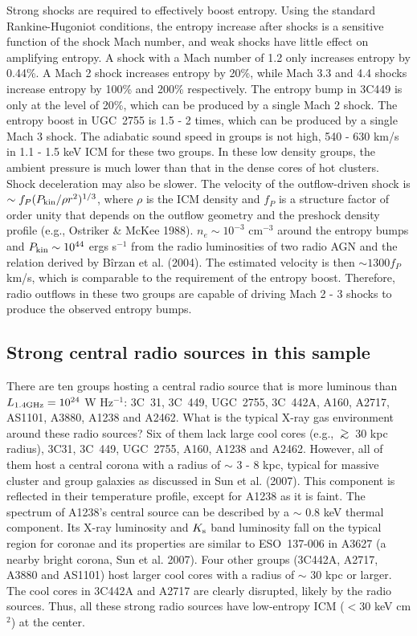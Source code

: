 \documentclass{aastex}
\newcommand{\gsim}{\mbox{\hspace{.2em}\raisebox{.5ex}{$>$}\hspace{-.8em}\raisebox{-.5ex}{$\sim$}\hspace{.2em}}}
\begin{document}
Strong shocks are required to effectively boost entropy. Using the
standard Rankine-Hugoniot conditions, the entropy increase after shocks is a
sensitive function of the shock Mach number, and weak shocks have little effect
on amplifying entropy. A shock with
a Mach number of 1.2 only increases entropy by 0.44\%. A Mach 2 shock
increases entropy by 20\%, while Mach 3.3 and 4.4 shocks increase
entropy by 100\% and 200\% respectively.
The entropy bump in 3C449 is only at the level of 20\%, which can be produced
by a single Mach 2 shock. The entropy boost in UGC~2755 is 1.5 - 2 times,
which can be produced by a single Mach 3 shock. The adiabatic sound speed
in groups is not high, 540 - 630 km/s in 1.1 - 1.5 keV ICM for these two groups.
In these low density groups, the ambient pressure is much lower than that in
the dense cores of hot clusters. Shock deceleration may also be slower.
The velocity of the outflow-driven shock
is $\sim f_{P} (P_{\rm kin}/\rho r^{2})^{1/3}$, where $\rho$ is the ICM density and
$f_{P}$ is a structure factor of order unity that depends on the outflow geometry
and the preshock density profile (e.g., Ostriker \& McKee 1988). $n_{e} \sim
10^{-3}$ cm$^{-3}$ around the entropy bumps and $P_{\rm kin} \sim 10^{44}$
ergs s$^{-1}$ from the radio luminosities of two radio AGN and the relation
derived by B\^{i}rzan et al. (2004). The estimated velocity is then
$\sim 1300 f_{P}$ km/s, which is comparable to the requirement of
the entropy boost. Therefore, radio outflows in these two groups are capable of
driving Mach 2 - 3 shocks to produce the observed entropy bumps.

\subsection{Strong central radio sources in this sample}

There are ten groups hosting a central radio source that is more luminous
than $L_{\rm 1.4 GHz} = 10^{24}$ W Hz$^{-1}$:
3C~31, 3C~449, UGC~2755, 3C~442A, A160, A2717, AS1101, A3880, A1238 and A2462.
What is the typical X-ray gas environment around these radio sources?
Six of them lack large cool cores (e.g., $\gsim$ 30 kpc radius), 3C31, 3C~449, UGC~2755, A160,
A1238 and A2462. However, all of them host a central corona with a radius of $\sim$
3 - 8 kpc, typical for massive cluster and group galaxies as discussed in
Sun et al. (2007).
This component is reflected in their temperature profile, except for
A1238 as it is faint. The spectrum of A1238's central source can be
described by a $\sim$ 0.8 keV thermal component. Its X-ray luminosity and
$K_{\rm s}$ band luminosity fall on the typical region for coronae and
its properties are similar to ESO~137-006 in A3627 (a nearby bright corona, Sun et al. 2007).
Four other groups (3C442A, A2717, A3880 and AS1101) host larger cool cores
with a radius of $\sim$ 30 kpc or larger. The cool cores in 3C442A and
A2717 are clearly disrupted, likely by the radio sources.
Thus, all these strong radio sources have low-entropy ICM ($< 30$ keV cm$^{2}$) at
the center.
\end{document}
